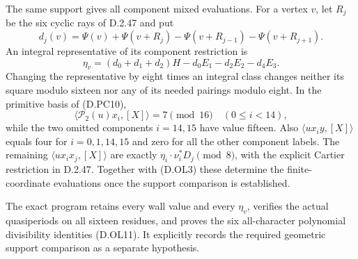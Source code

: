 The same support gives all component mixed evaluations. For a
vertex $v$, let $R_j$ be the six cyclic rays of D.2.47 and put
\[
 d_j(v)=\Psi(v)+\Psi(v+R_j)
                  -\Psi(v+R_{j-1})-\Psi(v+R_{j+1}).
\]
An integral representative of its component restriction is
\[
 \eta_v=(d_0+d_1+d_2)H-d_0E_1-d_2E_2-d_4E_3.
                                                               \tag{D.OL12}
\]
Changing the representative by eight times an integral class
changes neither its square modulo sixteen nor any of its needed
pairings modulo eight. In the primitive basis of (D.PC10),
\[
 \langle\mathcal P_2(u)x_i,[X]\rangle=7\pmod{16}
                     \quad(0\le i<14),
\]
while the two omitted components $i=14,15$ have value fifteen.
Also $\langle ux_i y,[X]\rangle$ equals four for $i=0,1,14,15$
and zero for all the other component labels. The remaining
$\langle ux_i x_j,[X]\rangle$ are exactly
$\eta_i\cdot\nu_i^*D_j\pmod8$, with the explicit Cartier
restriction in D.2.47. Together with (D.OL3) these determine the
finite-coordinate evaluations once the support comparison is
established.

The exact program
retains every wall value and every $\eta_v$, verifies the actual
quasiperiods on all sixteen residues, and proves the six
all-character polynomial divisibility identities (D.OL11).
It explicitly records the required geometric support comparison
as a separate hypothesis.
